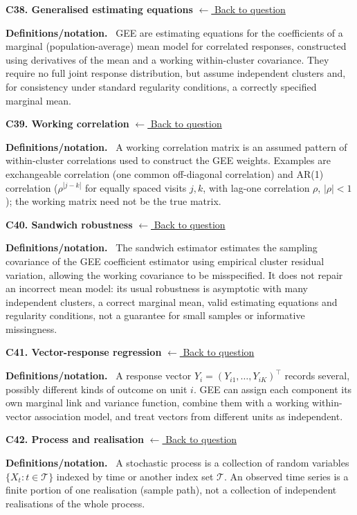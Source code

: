 \documentclass[11pt,a4paper]{article}
\newcommand{\concepttopic}[1]{%
  \par\addvspace{8pt}\noindent{\color{statblue}\bfseries #1}\par\nobreak\smallskip}
\newenvironment{conceptanswer}[2]
  {\par\addvspace{10pt}\noindent\begin{minipage}{\linewidth}%
   \hypertarget{concept-answer:#1}{}%
   \textcolor{statblue}{\textbf{C#1. #2}}\hfill%
   {\footnotesize\hyperlink{concept-question:#1}{$\leftarrow$ Back to question}}%
   \par\smallskip\textbf{Definitions/notation.}\ }
  {\end{minipage}\par}
\begin{document}
\concepttopic{GEE and vector responses}
\begin{conceptanswer}{38}{Generalised estimating equations}
GEE are estimating equations for the coefficients of a marginal
(population-average) mean model for correlated responses, constructed
using derivatives of the mean and a working within-cluster covariance.
They require no full joint response distribution, but assume independent
clusters and, for consistency under standard regularity conditions,
a correctly specified marginal mean.
\end{conceptanswer}

\begin{conceptanswer}{39}{Working correlation}
A working correlation matrix is an assumed pattern of within-cluster
correlations used to construct the GEE weights.
Examples are exchangeable correlation (one common off-diagonal
correlation) and AR(1) correlation ($\rho^{|j-k|}$ for equally spaced
visits $j,k$, with lag-one correlation $\rho$, $|\rho|<1$);
the working matrix need not be the true matrix.
\end{conceptanswer}

\begin{conceptanswer}{40}{Sandwich robustness}
The sandwich estimator estimates the sampling covariance of the GEE
coefficient estimator using empirical cluster residual variation,
allowing the working covariance to be misspecified.
It does not repair an incorrect mean model: its usual robustness is
asymptotic with many independent clusters, a correct marginal mean,
valid estimating equations and regularity conditions, not a guarantee
for small samples or informative missingness.
\end{conceptanswer}

\begin{conceptanswer}{41}{Vector-response regression}
A response vector $Y_i=(Y_{i1},\ldots,Y_{iK})^\top$ records several,
possibly different kinds of outcome on unit $i$.
GEE can assign each component its own marginal link and variance
function, combine them with a working within-vector association model,
and treat vectors from different units as independent.
\end{conceptanswer}

\concepttopic{Time series}
\begin{conceptanswer}{42}{Process and realisation}
A stochastic process is a collection of random variables
$\{X_t:t\in\mathcal T\}$ indexed by time or another index set
$\mathcal T$.
An observed time series is a finite portion of one realisation
(sample path), not a collection of independent realisations of the
whole process.
\end{conceptanswer}
\end{document}
